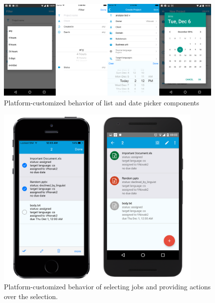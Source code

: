 \begin{figure}[H]
	\includegraphics[width=1\textwidth]{pics/components}
	\caption{Platform-customized behavior of list and date picker components}
	\label{components}
\end{figure}

\begin{figure}[]
	\includegraphics[width=0.9\textwidth]{pics/screenshots/projs}
	\caption{Platform-customized behavior of selecting jobs and providing actions over the selection.}
	\label{jobList}
\end{figure}



